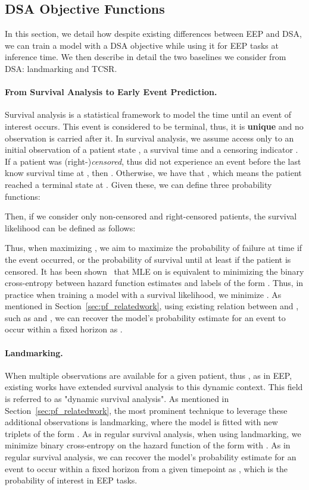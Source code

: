 \documentclass[nohyperref]{article}
\begin{document}
\subsection{DSA Objective Functions}

In this section, we detail how despite existing differences between EEP and DSA, we can train a model with a DSA objective while using it for EEP tasks at inference time. We then describe in detail the two baselines we consider from DSA: landmarking and TCSR.
\paragraph{From Survival Analysis to Early Event Prediction.} Survival analysis is a statistical framework to model the time  until an event of
interest occurs. This event is considered to be terminal, thus, it is \textbf{unique} and no observation is carried after it. In survival analysis, we assume access only to an initial observation of a patient state , a survival time  and a censoring indicator . If a patient was (right-)\textit{censored}, thus did not experience an event before the last know survival time at , then . Otherwise, we have that , which means the patient reached a terminal state at . Given these, we can define three probability functions:

Then, if we consider only non-censored and right-censored patients, the survival likelihood can be defined as follows:

Thus, when maximizing , we aim to maximize the probability of failure at time  if the event occurred, or the probability of survival until at least  if the patient is censored. 
It has been shown~\citep{kalbfleisch2011statistical,craig2021survival} that MLE on  is equivalent to minimizing the binary cross-entropy between hazard function estimates and labels of the form . Thus, in practice when training a model with a survival likelihood, we minimize .
As mentioned in Section~\ref{sec:pf_relatedwork}, using existing relation between  and , such as  and  , we can recover the model's probability estimate for an event to occur within a fixed horizon  as .


\paragraph{Landmarking.} When multiple observations are available for a given patient, thus , as in EEP, existing works \cite{van2007dynamic,parast2014landmark} have extended survival analysis to this dynamic context. This field is referred to as "dynamic survival analysis". As mentioned in Section~\ref{sec:pf_relatedwork}, the most prominent technique to leverage these additional observations is landmarking, where the model is fitted with new triplets of the form . As in regular survival analysis, when using landmarking, we minimize binary cross-entropy on the hazard function of the form    with  .
As in regular survival analysis, we can recover the model's probability estimate for an event to occur within a fixed horizon  from a given timepoint  as , which is the probability of interest in EEP tasks.
\end{document}
